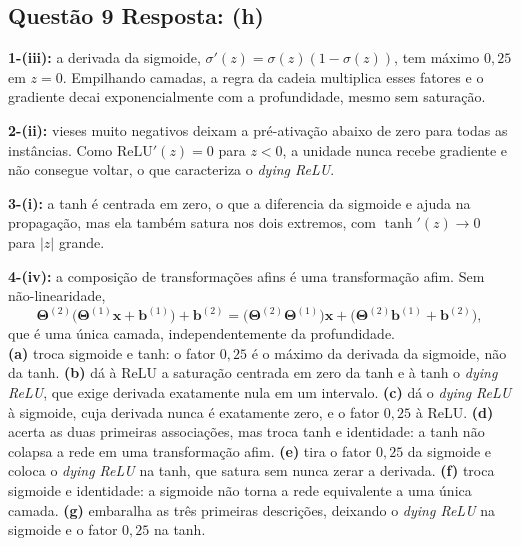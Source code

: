 \documentclass[11pt,a4paper]{article}
\begin{document}
\subsection*{Questão 9 \textemdash{} Resposta: (h)}
\textbf{1-(iii):} a derivada da sigmoide, $\sigma'(z) = \sigma(z)(1 - \sigma(z))$, tem máximo $0{,}25$ em $z = 0$. Empilhando camadas, a regra da cadeia multiplica esses fatores e o gradiente decai exponencialmente com a profundidade, mesmo sem saturação.

\textbf{2-(ii):} vieses muito negativos deixam a pré-ativação abaixo de zero para todas as instâncias. Como $\mathrm{ReLU}'(z) = 0$ para $z < 0$, a unidade nunca recebe gradiente e não consegue voltar, o que caracteriza o \textit{dying ReLU}.

\textbf{3-(i):} a tanh é centrada em zero, o que a diferencia da sigmoide e ajuda na propagação, mas ela também satura nos dois extremos, com $\tanh'(z) \to 0$ para $|z|$ grande.

\textbf{4-(iv):} a composição de transformações afins é uma transformação afim. Sem não-linearidade,
\[
\mathbf{\Theta}^{(2)}\bigl(\mathbf{\Theta}^{(1)}\mathbf{x} + \mathbf{b}^{(1)}\bigr) + \mathbf{b}^{(2)}
= \bigl(\mathbf{\Theta}^{(2)}\mathbf{\Theta}^{(1)}\bigr)\mathbf{x} + \bigl(\mathbf{\Theta}^{(2)}\mathbf{b}^{(1)} + \mathbf{b}^{(2)}\bigr),
\]
que é uma única camada, independentemente da profundidade.\\
\textbf{(a)} troca sigmoide e tanh: o fator $0{,}25$ é o máximo da derivada da sigmoide, não da tanh.
\textbf{(b)} dá à ReLU a saturação centrada em zero da tanh e à tanh o \textit{dying ReLU}, que exige derivada exatamente nula em um intervalo.
\textbf{(c)} dá o \textit{dying ReLU} à sigmoide, cuja derivada nunca é exatamente zero, e o fator $0{,}25$ à ReLU.
\textbf{(d)} acerta as duas primeiras associações, mas troca tanh e identidade: a tanh não colapsa a rede em uma transformação afim.
\textbf{(e)} tira o fator $0{,}25$ da sigmoide e coloca o \textit{dying ReLU} na tanh, que satura sem nunca zerar a derivada.
\textbf{(f)} troca sigmoide e identidade: a sigmoide não torna a rede equivalente a uma única camada.
\textbf{(g)} embaralha as três primeiras descrições, deixando o \textit{dying ReLU} na sigmoide e o fator $0{,}25$ na tanh.
\end{document}
